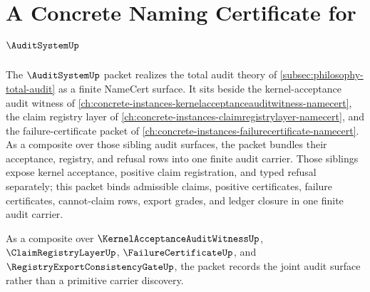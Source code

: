 \chapter{A Concrete Naming Certificate for $\AuditSystemUp$}
\label{ch:concrete-instances-auditsystem-namecert}

The $\AuditSystemUp$ packet realizes the total audit theory of \autoref{subsec:philosophy-total-audit} as a finite NameCert surface. It sits beside the kernel-acceptance audit witness of \autoref{ch:concrete-instances-kernelacceptanceauditwitness-namecert}, the claim registry layer of \autoref{ch:concrete-instances-claimregistrylayer-namecert}, and the failure-certificate packet of \autoref{ch:concrete-instances-failurecertificate-namecert}. As a composite over those sibling audit surfaces, the packet bundles their acceptance, registry, and refusal rows into one finite audit carrier. Those siblings expose kernel acceptance, positive claim registration, and typed refusal separately; this packet binds admissible claims, positive certificates, failure certificates, cannot-claim rows, export grades, and ledger closure in one finite audit carrier.

As a composite over $\KernelAcceptanceAuditWitnessUp$, $\ClaimRegistryLayerUp$, $\FailureCertificateUp$, and $\RegistryExportConsistencyGateUp$, the packet records the joint audit surface rather than a primitive carrier discovery.

